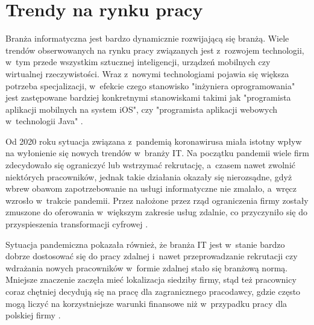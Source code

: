 



\section{Trendy na rynku pracy}

Branża informatyczna jest bardzo dynamicznie rozwijającą się branżą.
Wiele trendów obserwowanych na rynku pracy związanych jest z~rozwojem technologii, w~tym przede wszystkim sztucznej inteligencji, urządzeń mobilnych czy wirtualnej rzeczywistości.
Wraz z~nowymi technologiami pojawia się większa potrzeba specjalizacji, w~efekcie czego stanowisko "inżyniera oprogramowania" jest zastępowane bardziej konkretnymi stanowiskami takimi jak "programista aplikacji mobilnych na system iOS", czy "programista aplikacji webowych w~technologii Java" \cite{it-polyglots-2015}.

Od 2020 roku sytuacja związana z~pandemią koronawirusa miała istotny wpływ na wyłonienie się nowych trendów w~branży IT.
Na początku pandemii wiele firm zdecydowało się ograniczyć lub wstrzymać rekrutację, a~czasem nawet zwolnić niektórych pracowników, jednak takie działania okazały się nierozsądne, gdyż wbrew obawom zapotrzebowanie na usługi informatyczne nie zmalało, a~wręcz wzrosło w~trakcie pandemii.
Przez nałożone przez rząd ograniczenia firmy zostały zmuszone do oferowania w~większym zakresie usług zdalnie, co przyczyniło się do przyspieszenia transformacji cyfrowej \cite{it-covid-2021}.

Sytuacja pandemiczna pokazała również, że branża IT jest w~stanie bardzo dobrze dostosować się do pracy zdalnej i~nawet przeprowadzanie rekrutacji czy wdrażania nowych pracowników w~formie zdalnej stało się branżową normą.
Mniejsze znaczenie zaczęła mieć lokalizacja siedziby firmy, stąd też pracownicy coraz chętniej decydują się na pracę dla zagranicznego pracodawcy, gdzie często mogą liczyć na korzystniejsze warunki finansowe niż w~przypadku pracy dla polskiej firmy \cite{it-covid-2021}.


